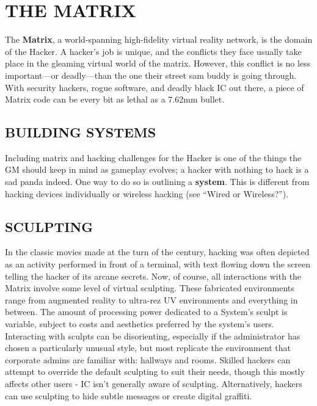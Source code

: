 \documentclass[oneside,10pt]{article}
\begin{document}
\section{THE MATRIX}
\begin{multicols}{2}
  The \textbf{Matrix}, a world-spanning high-fidelity virtual reality
  network, is the domain of the Hacker. A hacker’s job is unique, and
  the conflicts they face usually take place in the gleaming virtual
  world of the matrix. However, this conflict is no less important—or
  deadly—than the one their street sam buddy is going through. With
  security hackers, rogue software, and deadly black IC out there, a
  piece of Matrix code can be every bit as lethal as a 7.62mm bullet.

  \subsection{BUILDING SYSTEMS}
  Including matrix and hacking challenges for the Hacker is one of the
  things the GM should keep in mind as gameplay evolves; a hacker with
  nothing to hack is a sad panda indeed.  One way to do so is
  outlining a \textbf{system}. This is different from hacking devices
  individually or wireless hacking (see ``Wired or Wireless?'').

  \subsection{SCULPTING}
  In the classic movies made at the turn of the century, hacking was
  often depicted as an activity performed in front of a terminal, with
  text flowing down the screen telling the hacker of its arcane
  secrets. Now, of course, all interactions with the Matrix involve
  some level of virtual sculpting. These fabricated environments range
  from augmented reality to ultra-rez UV environments and everything
  in between. The amount of processing power dedicated to a System's
  sculpt is variable, subject to costs and aesthetics preferred by the
  system's users. Interacting with sculpts can be disorienting,
  especially if the administrator has chosen a particularly unusual
  style, but most replicate the environment that corporate admins are
  familiar with: hallways and rooms. Skilled hackers can attempt to
  override the default sculpting to suit their needs, though this
  mostly affects other users - IC isn't generally aware of
  sculpting. Alternatively, hackers can use sculpting to hide subtle messages
  or create digital graffiti.
  

\end{multicols}
\end{document}
